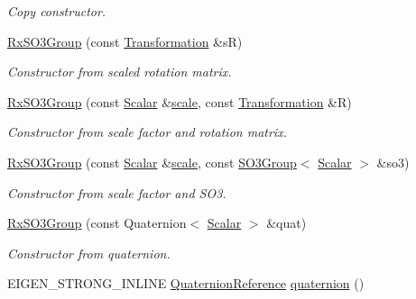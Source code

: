 \begin{DoxyCompactItemize}
\begin{DoxyCompactList}\small\item\em Copy constructor. \end{DoxyCompactList}\item 
\hyperlink{class_sophus_1_1_rx_s_o3_group_ad271361baf1d50722638870defc9e575}{Rx\+S\+O3\+Group} (const \hyperlink{class_sophus_1_1_rx_s_o3_group_ac8c43cedd9690622ff696fd1473fdfce}{Transformation} \&sR)
\begin{DoxyCompactList}\small\item\em Constructor from scaled rotation matrix. \end{DoxyCompactList}\item 
\hyperlink{class_sophus_1_1_rx_s_o3_group_a602f7551e896428c8241331ae075416a}{Rx\+S\+O3\+Group} (const \hyperlink{class_sophus_1_1_rx_s_o3_group_a0c1248ba4deaab0ef231b74c60f77f87}{Scalar} \&\hyperlink{class_sophus_1_1_rx_s_o3_group_base_a568f5cbdc1a40cd0f6237a91da65cf4a}{scale}, const \hyperlink{class_sophus_1_1_rx_s_o3_group_ac8c43cedd9690622ff696fd1473fdfce}{Transformation} \&R)
\begin{DoxyCompactList}\small\item\em Constructor from scale factor and rotation matrix. \end{DoxyCompactList}\item 
\hyperlink{class_sophus_1_1_rx_s_o3_group_a39635b4b1f03eb43bb506b17b1bfe353}{Rx\+S\+O3\+Group} (const \hyperlink{class_sophus_1_1_rx_s_o3_group_a0c1248ba4deaab0ef231b74c60f77f87}{Scalar} \&\hyperlink{class_sophus_1_1_rx_s_o3_group_base_a568f5cbdc1a40cd0f6237a91da65cf4a}{scale}, const \hyperlink{class_sophus_1_1_s_o3_group}{S\+O3\+Group}$<$ \hyperlink{class_sophus_1_1_rx_s_o3_group_a0c1248ba4deaab0ef231b74c60f77f87}{Scalar} $>$ \&so3)
\begin{DoxyCompactList}\small\item\em Constructor from scale factor and S\+O3. \end{DoxyCompactList}\item 
\hyperlink{class_sophus_1_1_rx_s_o3_group_a1c709c4ea5da483f12b968abfdbee68c}{Rx\+S\+O3\+Group} (const Quaternion$<$ \hyperlink{class_sophus_1_1_rx_s_o3_group_a0c1248ba4deaab0ef231b74c60f77f87}{Scalar} $>$ \&quat)
\begin{DoxyCompactList}\small\item\em Constructor from quaternion. \end{DoxyCompactList}\item 
E\+I\+G\+E\+N\+\_\+\+S\+T\+R\+O\+N\+G\+\_\+\+I\+N\+L\+I\+NE \hyperlink{class_sophus_1_1_rx_s_o3_group_a01e579c31ebe7063ef5b737f53cd99cb}{Quaternion\+Reference} \hyperlink{class_sophus_1_1_rx_s_o3_group_add7f349475c8b3c92ebe761b47d62b31}{quaternion} ()\hypertarget{class_sophus_1_1_rx_s_o3_group_add7f349475c8b3c92ebe761b47d62b31}{}\label{class_sophus_1_1_rx_s_o3_group_add7f349475c8b3c92ebe761b47d62b31}


\end{DoxyCompactItemize}
